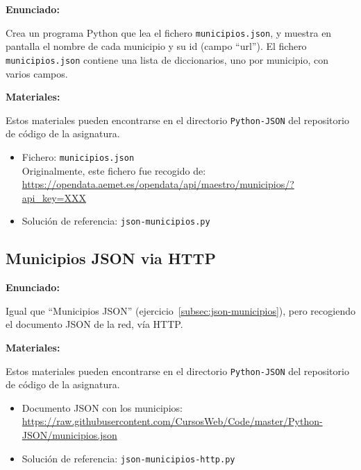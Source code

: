\textbf{Enunciado:}

Crea un programa Python que lea el fichero \verb|municipios.json|,
y muestra en pantalla el nombre de cada municipio y su id (campo ``url'').
El fichero \verb|municipios.json| contiene una lista de diccionarios,
uno por municipio, con varios campos.

\textbf{Materiales:}

Estos materiales pueden encontrarse en el
directorio \verb|Python-JSON| del repositorio de código de la
asignatura. 

\begin{itemize}
\item Fichero: \verb|municipios.json| \\
  Originalmente, este fichero fue recogido de: \\
  \url{https://opendata.aemet.es/opendata/api/maestro/municipios/?api_key=XXX}
\item Solución de referencia: \verb|json-municipios.py|
\end{itemize}

\subsection{Municipios JSON via HTTP}
\label{subsec:json-municipios-http}

\textbf{Enunciado:}

Igual que ``Municipios JSON'' (ejercicio~\ref{subsec:json-municipios}),
pero recogiendo el documento JSON de la red, vía HTTP.

\textbf{Materiales:}

Estos materiales pueden encontrarse en el
directorio \verb|Python-JSON| del repositorio de código de la
asignatura. 

\begin{itemize}
\item Documento JSON con los municipios: \\
  \url{https://raw.githubusercontent.com/CursosWeb/Code/master/Python-JSON/municipios.json}
\item Solución de referencia: \verb|json-municipios-http.py|
\end{itemize}

